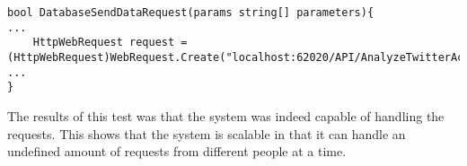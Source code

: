 \begin{minipage}[H]{\linewidth}
\begin{lstlisting}[caption = Code initiating the stress test, label = stressTestCode] 
bool DatabaseSendDataRequest(params string[] parameters){
...
	HttpWebRequest request = (HttpWebRequest)WebRequest.Create("localhost:62020/API/AnalyzeTwitterAccount");
...
}
\end{lstlisting}
\end{minipage}

The results of this test was that the system was indeed capable of handling the
requests. This shows that the system is scalable in that it can handle an
undefined amount of requests from different people at a time.


% 
% 
% 
% 
% 
% 
% 
